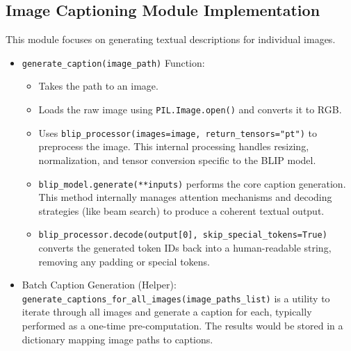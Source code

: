 \documentclass{article}
\begin{document}
\subsection{Image Captioning Module Implementation}
This module focuses on generating textual descriptions for individual images.
\begin{itemize}
    \item \texttt{generate\_caption(image\_path)} Function:
    \begin{itemize}
        \item Takes the path to an image.
        \item Loads the raw image using \texttt{PIL.Image.open()} and converts it to RGB.
        \item Uses \texttt{blip\_processor(images=image, return\_tensors="pt")} to preprocess the image. This internal processing handles resizing, normalization, and tensor conversion specific to the BLIP model.
        \item \texttt{blip\_model.generate(**inputs)} performs the core caption generation. This method internally manages attention mechanisms and decoding strategies (like beam search) to produce a coherent textual output.
        \item \texttt{blip\_processor.decode(output[0], skip\_special\_tokens=True)} converts the generated token IDs back into a human-readable string, removing any padding or special tokens.
    \end{itemize}
    \item Batch Caption Generation (Helper): \texttt{generate\_captions\_for\_all\_images(image\_paths\_list)} is a utility to iterate through all images and generate a caption for each, typically performed as a one-time pre-computation. The results would be stored in a dictionary mapping image paths to captions.
\end{itemize}
\end{document}
